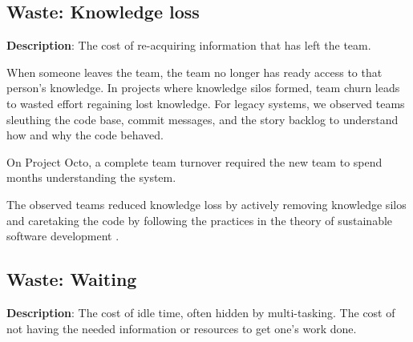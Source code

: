 \subsection{Waste: Knowledge loss}
\textbf{Description}: The cost of re-acquiring information that has left the team.

When someone leaves the team, the team no longer has ready access to that person's knowledge. In projects where knowledge silos formed, team churn leads to wasted effort regaining lost knowledge. For legacy systems, we observed teams sleuthing the code base, commit messages, and the story backlog to understand how and why the code behaved.  

On Project Octo, a complete team turnover required the new team to spend months understanding the system.

The observed teams reduced knowledge loss by actively removing knowledge silos and caretaking the code by following the practices in the theory of sustainable software development \cite{SedanoSustainableSoftware}.

\subsection{Waste: Waiting}
\textbf{Description}: The cost of idle time, often hidden by multi-tasking. The cost of not having the needed information or resources to get one's work done.

